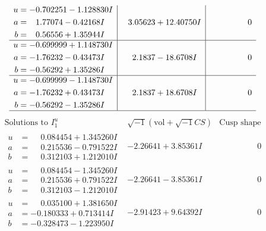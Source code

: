 \documentclass[1p]{elsarticle_modified}
\theoremstyle{definition}
\newcommand{\I}{\sqrt{-1}}
\begin{document}
$$\begin{array}{c|c|c}
\begin{aligned}
u &= -0.702251 - 1.128830 I \\
a &= \phantom{-}1.77074 - 0.42168 I \\
b &= \phantom{-}0.56556 + 1.35944 I\end{aligned}
 & \phantom{-}3.05623 + 12.40750 I & \phantom{-0.000000 } 0 \\ \hline\begin{aligned}
u &= -0.699999 + 1.148730 I \\
a &= -1.76232 - 0.43473 I \\
b &= -0.56292 + 1.35286 I\end{aligned}
 & \phantom{-}2.1837 - 18.6708 I & \phantom{-0.000000 } 0 \\ \hline\begin{aligned}
u &= -0.699999 - 1.148730 I \\
a &= -1.76232 + 0.43473 I \\
b &= -0.56292 - 1.35286 I\end{aligned}
 & \phantom{-}2.1837 + 18.6708 I & \phantom{-0.000000 } 0\\
 \hline 
 \end{array}$$\newpage$$\begin{array}{c|c|c}  
\text{Solutions to }I^u_{1}& \I (\text{vol} + \sqrt{-1}CS) & \text{Cusp shape}\\
 \hline 
\begin{aligned}
u &= \phantom{-}0.084454 + 1.345260 I \\
a &= \phantom{-}0.215536 - 0.791522 I \\
b &= \phantom{-}0.312103 + 1.212010 I\end{aligned}
 & -2.26641 + 3.85361 I & \phantom{-0.000000 } 0 \\ \hline\begin{aligned}
u &= \phantom{-}0.084454 - 1.345260 I \\
a &= \phantom{-}0.215536 + 0.791522 I \\
b &= \phantom{-}0.312103 - 1.212010 I\end{aligned}
 & -2.26641 - 3.85361 I & \phantom{-0.000000 } 0 \\ \hline\begin{aligned}
u &= \phantom{-}0.035100 + 1.381650 I \\
a &= -0.180333 + 0.713414 I \\
b &= -0.328473 - 1.223950 I\end{aligned}
 & -2.91423 + 9.64392 I & \phantom{-0.000000 } 0 \\ \hline\begin{aligned}

\end{aligned}
\end{array}$$
\end{document}
